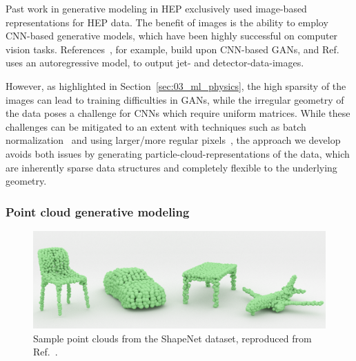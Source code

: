Past work in generative modeling in HEP exclusively used image-based representations for HEP data.
The benefit of images is the ability to employ CNN-based generative models, which have been highly successful on computer vision tasks.
References~\cite{deOliveira:2017pjk, Paganini:2017dwg, ATL-SOFT-PUB-2018-001, ATL-SOFT-PUB-2020-006, Erdmann:2018jxd, Carminati:2020kym},
for example, build upon CNN-based GANs, and Ref.~\cite{sarm} uses an autoregressive model, to output jet- and detector-data-images.

However, as highlighted in Section~\ref{sec:03_ml_physics}, the high sparsity of the images can lead to training difficulties in GANs, while the irregular geometry of the data poses a challenge for CNNs which require uniform matrices.
While these challenges can be mitigated to an extent with techniques such as batch normalization~\cite{ioffe2015batch} and using larger/more regular pixels~\cite{ATL-SOFT-PUB-2020-006}, the approach we develop avoids both issues by generating particle-cloud-representations of the data, which are inherently sparse data structures and completely flexible to the underlying geometry.


\subsubsection{Point cloud generative modeling}
\label{sec:04_mpgan_pcgans}


\begin{figure}[ht]
    \centering
    \includegraphics[width=\textwidth]{figures/03-ML/shapenet}
    \caption{Sample point clouds from the ShapeNet dataset, reproduced from Ref.~\cite{DBLP:journals/corr/GadelhaMW17}.}
    \label{fig:03_ml_shapenet}
\end{figure}

